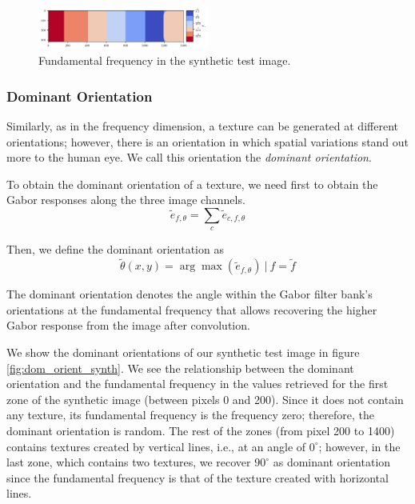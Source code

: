 \documentclass[journal]{IEEEtran}
\begin{document}
\begin{figure}[!ht]
	\includegraphics[width=0.5\textwidth]{fund_freq_synth}
    \caption{Fundamental frequency in the synthetic test image.}
    \label{fig:fund_freq_synth}
\end{figure}

\subsubsection{Dominant Orientation}
Similarly, as in the frequency dimension, a texture can be generated at different orientations; however, there is an orientation in which spatial variations stand out more to the human eye. We call this orientation the \textit{dominant orientation}.

To obtain the dominant orientation of a texture, we need first to obtain the Gabor responses along the three image channels.
\begin{equation}
	\widetilde{e}_{f, \theta} = \underset{c}{\sum} \widetilde{e}_{c, f, \theta}  \label{eq:gabor_energy_freq_orient}
\end{equation}

Then, we define the dominant orientation as 
\begin{equation}
	\widetilde{\theta}(x,y) =  \arg\max (\widetilde{e}_{f, \theta}) ~|~ f = \widetilde{f} \label{eq:dominant_orient}
\end{equation}

The dominant orientation denotes the angle within the Gabor filter bank's orientations at the fundamental frequency that allows recovering the higher Gabor response from the image after convolution.

We show the dominant orientations of our synthetic test image in figure \ref{fig:dom_orient_synth}. We see the relationship between the dominant orientation and the fundamental frequency in the values retrieved for the first zone of the synthetic image (between pixels 0 and 200). Since it does not contain any texture, its fundamental frequency is the frequency zero; therefore, the dominant orientation is random. The rest of the zones (from pixel 200 to 1400) contains textures created by vertical lines, i.e., at an angle of $0^\circ$; however, in the last zone, which contains two textures, we recover $90^\circ$ as dominant orientation since the fundamental frequency is that of the texture created with horizontal lines. 
\end{document}
